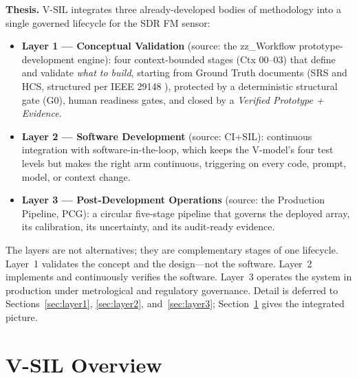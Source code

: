 \documentclass[11pt,a4paper]{article}
\begin{document}
\textbf{Thesis.} V-SIL integrates three already-developed bodies of methodology into a single
governed lifecycle for the SDR FM sensor:

\begin{itemize}
  \item \textbf{Layer 1 --- Conceptual Validation} (source: the zz\_Workflow
    prototype-development engine): four context-bounded stages (Ctx 00--03) that define and
    validate \emph{what to build}, starting from Ground Truth documents (SRS and HCS,
    structured per IEEE 29148 \cite{ieee29148}), protected by a deterministic structural gate
    (G0), human readiness gates, and closed by a \emph{Verified Prototype + Evidence}.
  \item \textbf{Layer 2 --- Software Development} (source: CI+SIL): continuous integration with
    software-in-the-loop, which keeps the V-model's four test levels but makes the right arm
    continuous, triggering on every code, prompt, model, or context change.
  \item \textbf{Layer 3 --- Post-Development Operations} (source: the Production Pipeline, PCG):
    a circular five-stage pipeline that governs the deployed array, its calibration, its
    uncertainty, and its audit-ready evidence.
\end{itemize}

The layers are not alternatives; they are complementary stages of one lifecycle. Layer~1
validates the concept and the design---not the software. Layer~2 implements and continuously
verifies the software. Layer~3 operates the system in production under metrological and
regulatory governance. Detail is deferred to Sections~\ref{sec:layer1}, \ref{sec:layer2}, and~\ref{sec:layer3};
Section~\ref{sec:overview} gives the integrated picture.

\section{V-SIL Overview}
\label{sec:overview}
\end{document}
